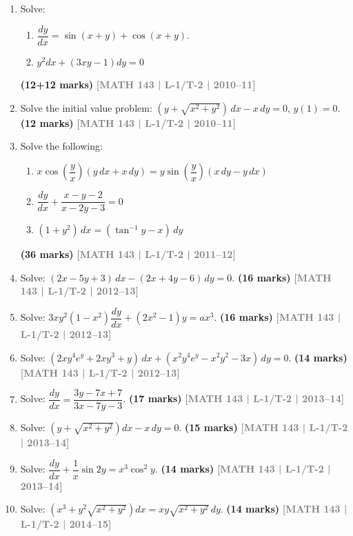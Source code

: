 \documentclass[12pt,a4paper]{article}
\newcommand{\yr}[1]{\hfill\textcolor{gray}{\small\textbf{[#1]}}}
\newcommand{\mk}[1]{\textcolor{orange!70!black}{\small\textbf{(#1 marks)}}}
\begin{document}
\begin{enumerate}

\item Solve: 
\begin{enumerate}
\item $\dfrac{dy}{dx}=\sin(x+y)+\cos(x+y)$.
\item  $y^2 dx + (3xy - 1)dy = 0$
\end{enumerate}

\mk{12+12} \yr{MATH 143 | L-1/T-2 | 2010--11}

\item Solve the initial value problem: $(y+\sqrt{x^{2}+y^{2}})\,dx - x\,dy = 0$, $y(1)=0$.
\mk{12\textonehalf} \yr{MATH 143 | L-1/T-2 | 2010--11}

\item Solve the following:
\begin{enumerate}
  \item $x\cos\!\left(\dfrac{y}{x}\right)(y\,dx+x\,dy)=y\sin\!\left(\dfrac{y}{x}\right)(x\,dy-y\,dx)$
  \item $\dfrac{dy}{dx}+\dfrac{x-y-2}{x-2y-3}=0$
  \item $(1+y^{2})\,dx=(\tan^{-1}y - x)\,dy$
\end{enumerate}
\mk{36} \yr{MATH 143 | L-1/T-2 | 2011--12}

\item Solve: $(2x-5y+3)\,dx-(2x+4y-6)\,dy=0$.
\mk{16\textonehalf} \yr{MATH 143 | L-1/T-2 | 2012--13}

\item Solve: $3xy^{2}(1-x^{2})\dfrac{dy}{dx}+(2x^{2}-1)y=ax^{3}$.
\mk{16} \yr{MATH 143 | L-1/T-2 | 2012--13}

\item Solve: $(2xy^{4}e^{y}+2xy^{3}+y)\,dx+(x^{2}y^{4}e^{y}-x^{2}y^{2}-3x)\,dy=0$.
\mk{14} \yr{MATH 143 | L-1/T-2 | 2012--13}

\item Solve: $\dfrac{dy}{dx}=\dfrac{3y-7x+7}{3x-7y-3}$.
\mk{17\textonehalf} \yr{MATH 143 | L-1/T-2 | 2013--14}

\item Solve: $\left(y+\sqrt{x^{2}+y^{2}}\right)dx - x\,dy = 0$.
\mk{15} \yr{MATH 143 | L-1/T-2 | 2013--14}

\item Solve: $\dfrac{dy}{dx}+\dfrac{1}{x}\sin 2y = x^{3}\cos^{2}y$.
\mk{14} \yr{MATH 143 | L-1/T-2 | 2013--14}

\item Solve: $\left(x^{3}+y^{2}\sqrt{x^{2}+y^{2}}\right)dx = xy\sqrt{x^{2}+y^{2}}\,dy$.
\mk{14} \yr{MATH 143 | L-1/T-2 | 2014--15}


\end{enumerate}
\end{document}
